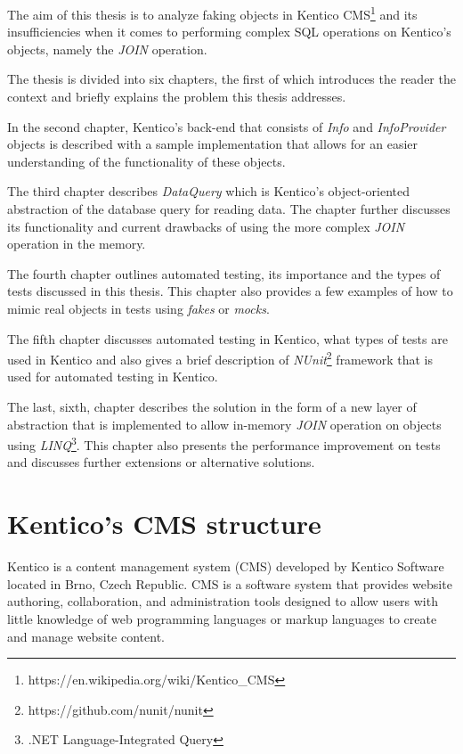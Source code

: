 \documentclass[
  print,
  table,
  nolof,
  nolot,
  nocover,
  oneside
]{fithesis3}
\begin{document}
The aim of this thesis is to analyze faking objects in Kentico CMS\footnote{https://en.wikipedia.org/wiki/Kentico\_CMS} and its insufficiencies when it comes to performing complex SQL operations on Kentico's objects, namely the \textit{JOIN} operation.

The thesis is divided into six chapters, the first of which introduces the reader the context and briefly explains the problem this thesis addresses.

In the second chapter, Kentico's back-end that consists of \textit{Info} and \textit{InfoProvider} objects is described with a sample implementation that allows for an easier understanding of the functionality of these objects.

The third chapter describes \textit{DataQuery} which is Kentico's object-oriented abstraction of the database query for reading data. The chapter further discusses its functionality and current drawbacks of using the more complex \textit{JOIN} operation in the memory.

The fourth chapter outlines automated testing, its importance and the types of tests discussed in this thesis. This chapter also provides a few examples of how to mimic real objects in tests using \textit{fakes} or \textit{mocks}.

The fifth chapter discusses automated testing in Kentico, what types of tests are used in Kentico and also gives a brief description of \textit{NUnit}\footnote{https://github.com/nunit/nunit} framework that is used for automated testing in Kentico.

The last, sixth, chapter describes the solution in the form of a new layer of abstraction that is implemented to allow in-memory \textit{JOIN} operation on objects using \textit{LINQ}\footnote{.NET Language-Integrated Query}. This chapter also presents the performance improvement on tests and discusses further extensions or alternative solutions.



\chapter{Kentico's CMS structure}

Kentico is a content management system (CMS) developed by Kentico Software located in Brno, Czech Republic. CMS is a software system that provides website authoring, collaboration, and administration tools designed to allow users with little knowledge of web programming languages or markup languages to create and manage website content\parencite{cms}.
\end{document}
